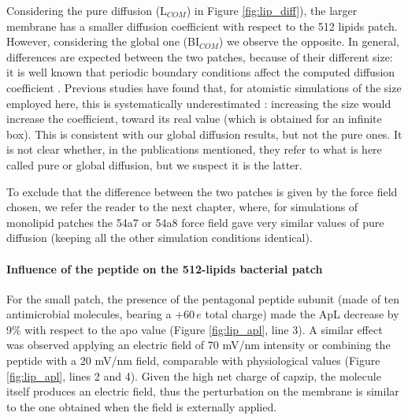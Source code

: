 Considering the pure diffusion (L$_{COM}$) in Figure \ref{fig:lip_diff}), the larger membrane has a smaller diffusion coefficient with respect to the 512 lipids patch. However, considering the global one (BI$_{COM}$) we observe the opposite.
%
In general, differences are expected between the two patches, because of their different size: it is well known that periodic boundary conditions affect the computed diffusion coefficient \citep{Camley2015,Venable2017}. Previous studies have found that, for atomistic simulations of the size employed here, this is systematically underestimated \citep{Camley2015}: increasing the size would increase the coefficient, toward its real value (which is obtained for an infinite box). This is consistent with our global diffusion results, but not the pure ones. It is not clear whether, in the publications mentioned, they refer to what is here called pure or global diffusion, but we suspect it is the latter.

To exclude that the difference between the two patches is given by the force field chosen, we refer the reader to the next chapter, where, for simulations of monolipid patches the 54a7 or 54a8 force field gave very similar values of pure diffusion (keeping all the other simulation conditions identical).

\paragraph{Influence of the peptide on the 512-lipids bacterial patch}
For the small patch, the presence of the pentagonal peptide subunit (made of ten antimicrobial molecules, bearing a $+60\,e$ total charge) made the ApL decrease by 9\% with respect to the apo value (Figure \ref{fig:lip_apl}, line 3).
%
A similar effect was observed applying an electric field of 70 mV/nm intensity or combining the peptide with a 20 mV/nm field, comparable with physiological values (Figure \ref{fig:lip_apl}, lines 2 and 4).
%
Given the high net charge of capzip, the molecule itself produces an electric field, thus the perturbation on the membrane is similar to the one obtained when the field is externally applied.

